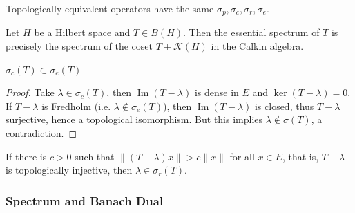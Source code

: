 \begin{proposition}
	\label{prop:TopEquivSpectrum}
	Topologically equivalent operators have the same $\sigma_p, \sigma_c, \sigma_r, \sigma_e$.
\end{proposition}

\begin{proposition}
	\label{prop:EssSpecCalkin}
	Let $H$ be a Hilbert space and $T \in B(H)$. Then the essential spectrum of $T$ is precisely the spectrum of the coset $T + \mathcal{K}(H)$ in the Calkin algebra.
\end{proposition}

\begin{proposition}
	\label{prop:ContEss}
	$\sigma_c(T) \subset \sigma_e(T)$
\end{proposition}
\begin{proof}
	Take $\lambda \in \sigma_c(T)$, then $\operatorname{Im} (T - \lambda)$ is dense in $E$ and $\operatorname{ker} (T - \lambda) = 0$. If $T - \lambda$ is Fredholm (i.e. $\lambda \not\in \sigma_e(T)$), then $\operatorname{Im} (T - \lambda)$ is closed, thus $T - \lambda$ surjective, hence a topological isomorphism. But this implies $\lambda \not\in \sigma(T)$, a contradiction.
\end{proof}


\begin{proposition}
	\label{prop:TopInjResidual}
	If there is $c>0$ such that $\|(T - \lambda) x\| > c \|x\|$ for all $x \in E$, that is, $T - \lambda$ is topologically injective, then $\lambda \in \sigma_r(T)$.
\end{proposition}

\subsubsection{Spectrum and Banach Dual}



